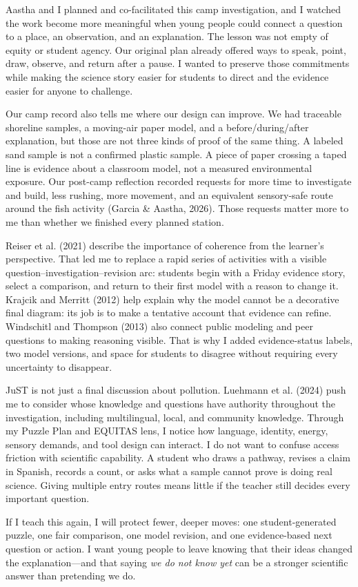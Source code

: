 Aastha and I planned and co-facilitated this camp investigation, and I watched the work become more meaningful when young people could connect a question to a place, an observation, and an explanation. The lesson was not empty of equity or student agency. Our original plan already offered ways to speak, point, draw, observe, and return after a pause. I wanted to preserve those commitments while making the science story easier for students to direct and the evidence easier for anyone to challenge.

Our camp record also tells me where our design can improve. We had traceable shoreline samples, a moving-air paper model, and a before/during/after explanation, but those are not three kinds of proof of the same thing. A labeled sand sample is not a confirmed plastic sample. A piece of paper crossing a taped line is evidence about a classroom model, not a measured environmental exposure. Our post-camp reflection recorded requests for more time to investigate and build, less rushing, more movement, and an equivalent sensory-safe route around the fish activity (Garcia \& Aastha, 2026). Those requests matter more to me than whether we finished every planned station.

Reiser et al. (2021) describe the importance of coherence from the learner's perspective. That led me to replace a rapid series of activities with a visible question--investigation--revision arc: students begin with a Friday evidence story, select a comparison, and return to their first model with a reason to change it. Krajcik and Merritt (2012) help explain why the model cannot be a decorative final diagram: its job is to make a tentative account that evidence can refine. Windschitl and Thompson (2013) also connect public modeling and peer questions to making reasoning visible. That is why I added evidence-status labels, two model versions, and space for students to disagree without requiring every uncertainty to disappear.

JuST is not just a final discussion about pollution. Luehmann et al. (2024) push me to consider whose knowledge and questions have authority throughout the investigation, including multilingual, local, and community knowledge. Through my Puzzle Plan and EQUITAS lens, I notice how language, identity, energy, sensory demands, and tool design can interact. I do not want to confuse access friction with scientific capability. A student who draws a pathway, revises a claim in Spanish, records a count, or asks what a sample cannot prove is doing real science. Giving multiple entry routes means little if the teacher still decides every important question.

If I teach this again, I will protect fewer, deeper moves: one student-generated puzzle, one fair comparison, one model revision, and one evidence-based next question or action. I want young people to leave knowing that their ideas changed the explanation---and that saying \emph{we do not know yet} can be a stronger scientific answer than pretending we do.
